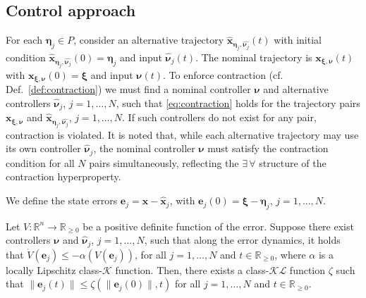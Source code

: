 \subsection{Control approach} 

For each $\boldsymbol{\eta}_j \in P$, consider an alternative trajectory $\hat{\mathbf{x}}_{\boldsymbol{\eta}_j, \hat{\boldsymbol{\nu}_j}}(t)$ with initial condition $\hat{\mathbf{x}}_{\boldsymbol{\eta}_j, \hat{\boldsymbol{\nu}_j}}(0) = \boldsymbol{\eta}_j$ and input $\hat{\boldsymbol{\nu}}_j(t)$. The nominal trajectory is $\mathbf{x}_{\boldsymbol{\xi}, \boldsymbol{\nu}}(t)$ with $\mathbf{x}_{\boldsymbol{\xi}, \boldsymbol{\nu}}(0) = \boldsymbol{\xi}$ and input $\boldsymbol{\nu}(t)$. To enforce contraction (cf. Def.~\ref{def:contraction}) we must find a nominal controller $\boldsymbol{\nu}$ and alternative controllers $\hat{\boldsymbol{\nu}}_j$, $j = 1, \dots, N$, such that \eqref{eq:contraction} holds for the trajectory pairs $\mathbf{x}_{\boldsymbol{\xi}, \boldsymbol{\nu}}$ and $\hat{\mathbf{x}}_{\boldsymbol{\eta}_j, \hat{\boldsymbol{\nu}_j}}$, $j = 1, \dots, N$. If such controllers do not exist for any pair, contraction is violated. It is noted that, while each alternative trajectory may use its own
controller $\hat{\boldsymbol{\nu}}_j$, the nominal controller $\boldsymbol{\nu}$ must satisfy the contraction condition for all $N$ pairs simultaneously, reflecting the $\exists \, \forall$ structure of the contraction hyperproperty.

We define the state errors $\mathbf{e}_j = \mathbf{x} - \hat{\mathbf{x}}_j$, with $\mathbf{e}_j(0) = \boldsymbol{\xi} - \boldsymbol{\eta}_j$, $j = 1, \dots, N$.
\begin{lemma}\label{lemma:khalil}
\cite{khalil2002} Let $V:\mathbb{R}^n \to \mathbb{R}_{\ge 0}$ be a positive definite function of the error. Suppose there exist controllers $\boldsymbol{\nu}$ and $\hat{\boldsymbol{\nu}}_j$, $j=1, \dots, N$, such that along the error dynamics, it holds that $\dot V(\mathbf{e}_j) \le -\alpha(V(\mathbf{e}_j))$, for all $j = 1, \dots, N$ and $t \in \mathbb{R}_{\ge 0}$, where $\alpha$ is a locally Lipschitz class-$\mathcal{K}$ function. Then, there exists a class-$\mathcal{KL}$ function $\zeta$ such that $\|\mathbf{e}_j(t)\| \le \zeta(\|\mathbf{e}_j(0)\|,t)$ for all $j = 1, \dots, N$ and $t \in \mathbb{R}_{\ge 0}$.
\end{lemma}

